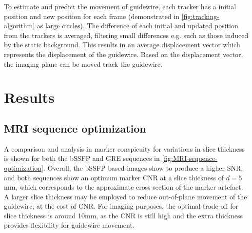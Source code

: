 \documentclass[conference]{IEEEtran}
\begin{document}
To estimate and predict the movement of guidewire, each tracker has a initial position and new position for each frame (demonstrated in \autoref{fig:tracking-algorithm} as large circles). The difference of each initial and updated position from the trackers is averaged, filtering small differences e.g. such as those induced by the static background. This results in an average displacement vector which represents the displacement of the guidewire. Based on the displacement vector, the imaging plane can be moved track the guidewire.

\section{Results}

\subsection{MRI sequence optimization}

A comparison and analysis in marker conspicuity for variations in slice thickness is shown for both the bSSFP and GRE sequences in \autoref{fig:MRI-sequence-optimization}. Overall, the bSSFP based images show to produce a higher SNR, and both sequences show an optimum marker CNR at a slice thickness of $d = 5$ mm, which corresponds to the approximate cross-section of the marker artefact. A larger slice thickness may be employed to reduce out-of-plane movement of the guidewire, at the cost of CNR. For imaging purposes, the optimal trade-off for slice thickness is around 10mm, as the CNR is still high and the extra thickness provides flexibility for guidewire movement.
\end{document}
